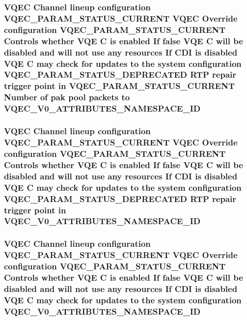 \subsubsection{\setlength{\rightskip}{0pt plus 5cm}VQEC Channel lineup configuration VQEC\_\-PARAM\_\-STATUS\_\-CURRENT VQEC Override configuration VQEC\_\-PARAM\_\-STATUS\_\-CURRENT Controls whether VQE \bf{C} is enabled If false VQE \bf{C} will be disabled and will not use any resources If CDI is disabled VQE \bf{C} may check for updates \bf{to} the system configuration VQEC\_\-PARAM\_\-STATUS\_\-DEPRECATED RTP repair trigger point in VQEC\_\-PARAM\_\-STATUS\_\-CURRENT Number of pak pool packets \bf{to} \bf{VQEC\_\-V0\_\-ATTRIBUTES\_\-NAMESPACE\_\-ID}}\label{vqec__cfg__settings_8h_eab2460757545c97bc0ae5e47642884f}


\subsubsection{\setlength{\rightskip}{0pt plus 5cm}VQEC Channel lineup configuration VQEC\_\-PARAM\_\-STATUS\_\-CURRENT VQEC Override configuration VQEC\_\-PARAM\_\-STATUS\_\-CURRENT Controls whether VQE \bf{C} is enabled If false VQE \bf{C} will be disabled and will not use any resources If CDI is disabled VQE \bf{C} may check for updates \bf{to} the system configuration VQEC\_\-PARAM\_\-STATUS\_\-DEPRECATED RTP repair trigger point in \bf{VQEC\_\-V0\_\-ATTRIBUTES\_\-NAMESPACE\_\-ID}}\label{vqec__cfg__settings_8h_2b29554675276a94a0885b2fdb7cf5e1}


\subsubsection{\setlength{\rightskip}{0pt plus 5cm}VQEC Channel lineup configuration VQEC\_\-PARAM\_\-STATUS\_\-CURRENT VQEC Override configuration VQEC\_\-PARAM\_\-STATUS\_\-CURRENT Controls whether VQE \bf{C} is enabled If false VQE \bf{C} will be disabled and will not use any resources If CDI is disabled VQE \bf{C} may check for updates \bf{to} the system configuration \bf{VQEC\_\-V0\_\-ATTRIBUTES\_\-NAMESPACE\_\-ID}}\label{vqec__cfg__settings_8h_1b50fd144546772318c9ae7ae27bb9e2}


